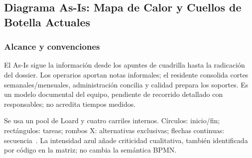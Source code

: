 \documentclass[12pt,letterpaper]{article}
\begin{document}
\subsection{Diagrama As-Is: Mapa de Calor y Cuellos de Botella Actuales}
\label{sec:asis-loard}

\subsubsection{Alcance y convenciones}
El As-Is sigue la información desde los apuntes de cuadrilla hasta la radicación del dossier. Los operarios aportan notas informales; el residente consolida cortes semanales/mensuales, administración concilia y calidad prepara los soportes. Es un modelo documental del equipo, pendiente de recorrido detallado con responsables; no acredita tiempos medidos.

Se usa un pool de Loard y cuatro carriles internos. Círculos: inicio/fin; rectángulos: tareas; rombos X: alternativas exclusivas; flechas continuas: secuencia~\cite{omg-bpmn}. La intensidad azul añade criticidad cualitativa, también identificada por código en la matriz; no cambia la semántica BPMN.
\end{document}

